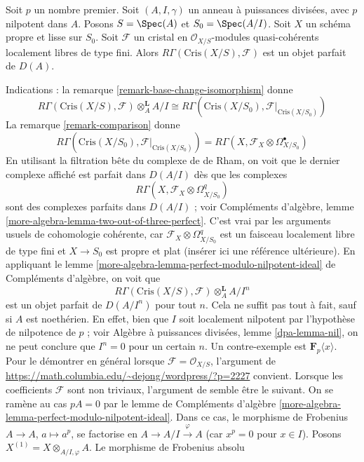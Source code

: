 \begin{remark}
\label{remark-perfect}
Soit $p$ un nombre premier. Soit $(A, I, \gamma)$ un anneau à puissances
divisées, avec $p$ nilpotent dans $A$. Posons $S = \Spec(A)$ et
$S_0 = \Spec(A/I)$. Soit $X$ un schéma propre et lisse sur $S_0$.
Soit $\mathcal{F}$ un cristal en
$\mathcal{O}_{X/S}$-modules quasi-cohérents localement libres de type fini.
Alors $R\Gamma(\text{Cris}(X/S), \mathcal{F})$ est un
objet parfait de $D(A)$.

\medskip\noindent
Indications : la remarque \ref{remark-base-change-isomorphism} donne
$$
R\Gamma(\text{Cris}(X/S), \mathcal{F}) \otimes_A^\mathbf{L} A/I
\cong
R\Gamma(\text{Cris}(X/S_0), \mathcal{F}|_{\text{Cris}(X/S_0)})
$$
La remarque \ref{remark-comparison} donne
$$
R\Gamma(\text{Cris}(X/S_0), \mathcal{F}|_{\text{Cris}(X/S_0)}) =
R\Gamma(X, \mathcal{F}_X \otimes \Omega^\bullet_{X/S_0})
$$
En utilisant la filtration bête du complexe de de Rham, on voit que
le dernier complexe affiché est parfait dans $D(A/I)$ dès que les complexes
$$
R\Gamma(X, \mathcal{F}_X \otimes \Omega^q_{X/S_0})
$$
sont des complexes parfaits dans $D(A/I)$ ; voir
Compléments d'algèbre, lemme \ref{more-algebra-lemma-two-out-of-three-perfect}.
C'est vrai par les arguments usuels
de cohomologie cohérente, car $\mathcal{F}_X \otimes \Omega^q_{X/S_0}$
est un faisceau localement libre de type fini et $X \to S_0$ est propre et plat
(insérer ici une référence ultérieure). En appliquant le
lemme \ref{more-algebra-lemma-perfect-modulo-nilpotent-ideal} de Compléments d'algèbre,
on voit que
$$
R\Gamma(\text{Cris}(X/S), \mathcal{F}) \otimes_A^\mathbf{L} A/I^n
$$
est un objet parfait de $D(A/I^n)$ pour tout $n$. Cela ne suffit pas tout à fait,
sauf si $A$ est noethérien. En effet, bien que $I$ soit localement nilpotent
par l'hypothèse de nilpotence de $p$ ; voir
Algèbre à puissances divisées, lemme \ref{dpa-lemma-nil},
on ne peut conclure que $I^n = 0$ pour un certain $n$. Un contre-exemple
est $\mathbf{F}_p\langle x \rangle$. Pour le démontrer en général lorsque
$\mathcal{F} = \mathcal{O}_{X/S}$, l'argument de
\url{https://math.columbia.edu/~dejong/wordpress/?p=2227}
convient. Lorsque les coefficients $\mathcal{F}$ sont non triviaux,
l'argument de \cite{Faltings-very} semble être le suivant. On se ramène au
cas $pA = 0$ par le lemme de Compléments d'algèbre
\ref{more-algebra-lemma-perfect-modulo-nilpotent-ideal}.
Dans ce cas, le morphisme de Frobenius $A \to A$, $a \mapsto a^p$, se factorise
en $A \to A/I \xrightarrow{\varphi} A$ (car $x^p = 0$ pour $x \in I$). Posons
$X^{(1)} = X \otimes_{A/I, \varphi} A$. Le morphisme de Frobenius absolu

\end{remark}
